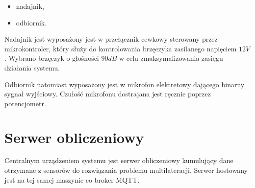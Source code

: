 \begin{itemize}
    \item nadajnik,
    \item odbiornik.
\end{itemize}

Nadajnik jest wyposażony jest w przełącznik cewkowy sterowany przez mikrokontroler, który służy do kontrolowania brzęczyka zasilanego napięciem $12V$. Wybrano brzęczyk o głośności $90dB$ w celu zmaksymalizowania zasięgu działania systemu.

Odbiornik natomiast wyposażony jest w mikrofon elektretowy dającego binarny sygnał wyjściowy. Czułość mikrofonu dostrajana jest ręcznie poprzez potencjometr.

\section{Serwer obliczeniowy}

Centralnym urządzeniem systemu jest serwer obliczeniowy kumulujący dane otrzymane z sensorów do rozwiązania problemu multilateracji. Serwer hostowany jest na tej samej maszynie co broker MQTT.